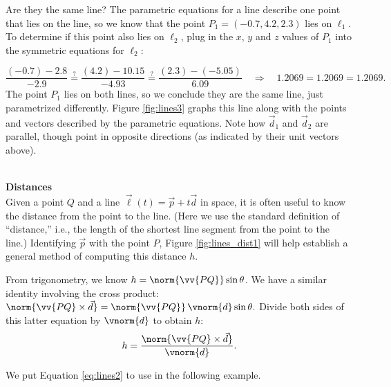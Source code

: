 {Are they the same line? The parametric equations for a line describe one point that lies on the line, so we know that the point $P_1 = (-0.7,4.2,2.3)$ lies on $\ell_1$. To determine if this point also lies on $\ell_2$, plug in the $x$, $y$ and $z$ values of $P_1$ into the symmetric equations for $\ell_2$:

\small
\[
\frac{(-0.7)-2.8}{-2.9} \stackrel{?}{=} \frac{(4.2)-10.15}{-4.93} \stackrel{?}{=} \frac{(2.3)-(-5.05)}{6.09} \quad \Rightarrow \quad 1.2069=1.2069=1.2069.
\]
\normalsize
{}
The point $P_1$ lies on both lines, so we conclude they are the same line, just parametrized differently. Figure \ref{fig:lines3} graphs this line along with the points and vectors described by the parametric equations. Note how $\vec d_1$ and $\vec d_2$ are parallel, though point in opposite directions (as indicated by their unit vectors above). 
}\\

\noindent\textbf{\large Distances}\\

Given a point $Q$ and a line $\vec\ell(t) = \vec p+t\vec d$ in space, it is often useful to know the distance from the point to the line. (Here we use the standard definition of ``distance,'' i.e., the length of the shortest line segment from the point to the line.) Identifying $\vec p$ with the point $P$, Figure \ref{fig:lines_dist1} will help establish a general method of computing this distance $h$.


From trigonometry, we know $h = \norm{\vv{PQ}}\sin\theta$. We have a similar identity involving the cross product: $\norm{\vv{PQ}\times \vec d} = \norm{\vv{PQ}}\, \vnorm{d}\sin\theta.$ Divide both sides of this latter equation by $\vnorm{d}$ to obtain $h$:
\begin{equation}
h = \frac{\norm{\vv{PQ}\times \vec d}}{\vnorm{d}}.
\label{eq:lines2}
\end{equation}

We put Equation \eqref{eq:lines2} to use in the following example.\\

